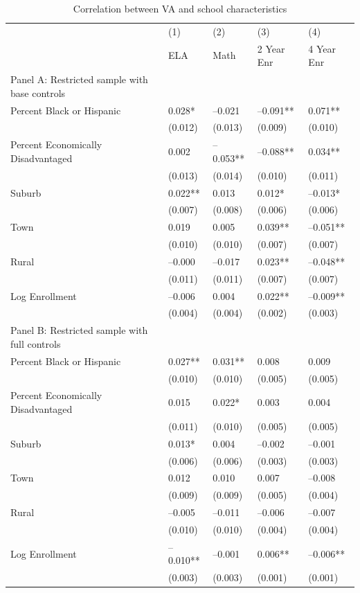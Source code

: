 \begin{table}[tbp] \centering
{}

\caption{Correlation between VA and school characteristics}
{\footnotesize
\begin{tabularx}{\linewidth}{lCCCC}

\toprule
&{(1)}&{(2)}&{(3)}&{(4)} \tabularnewline
{} & ELA & Math & 2 Year Enr & 4 Year Enr \tabularnewline
\midrule \addlinespace[\belowrulesep]
Panel A: Restricted sample with base controls&&&& \tabularnewline
\midrule Percent Black or Hispanic&0.028*&--0.021&--0.091**&0.071** \tabularnewline
&(0.012)&(0.013)&(0.009)&(0.010) \tabularnewline
\midrule Percent Economically Disadvantaged&0.002&--0.053**&--0.088**&0.034** \tabularnewline
&(0.013)&(0.014)&(0.010)&(0.011) \tabularnewline
\midrule Suburb&0.022**&0.013&0.012*&--0.013* \tabularnewline
&(0.007)&(0.008)&(0.006)&(0.006) \tabularnewline
Town&0.019&0.005&0.039**&--0.051** \tabularnewline
&(0.010)&(0.010)&(0.007)&(0.007) \tabularnewline
Rural&--0.000&--0.017&0.023**&--0.048** \tabularnewline
&(0.011)&(0.011)&(0.007)&(0.007) \tabularnewline
\midrule Log Enrollment&--0.006&0.004&0.022**&--0.009** \tabularnewline
&(0.004)&(0.004)&(0.002)&(0.003) \tabularnewline
\midrule \midrule Panel B: Restricted sample with full controls&&&& \tabularnewline
\midrule Percent Black or Hispanic&0.027**&0.031**&0.008&0.009 \tabularnewline
&(0.010)&(0.010)&(0.005)&(0.005) \tabularnewline
\midrule Percent Economically Disadvantaged&0.015&0.022*&0.003&0.004 \tabularnewline
&(0.011)&(0.010)&(0.005)&(0.005) \tabularnewline
\midrule Suburb&0.013*&0.004&--0.002&--0.001 \tabularnewline
&(0.006)&(0.006)&(0.003)&(0.003) \tabularnewline
Town&0.012&0.010&0.007&--0.008 \tabularnewline
&(0.009)&(0.009)&(0.005)&(0.004) \tabularnewline
Rural&--0.005&--0.011&--0.006&--0.007 \tabularnewline
&(0.010)&(0.010)&(0.004)&(0.004) \tabularnewline
\midrule Log Enrollment&--0.010**&--0.001&0.006**&--0.006** \tabularnewline
&(0.003)&(0.003)&(0.001)&(0.001) \tabularnewline
\bottomrule 

\end{tabularx}
}
\end{table}
